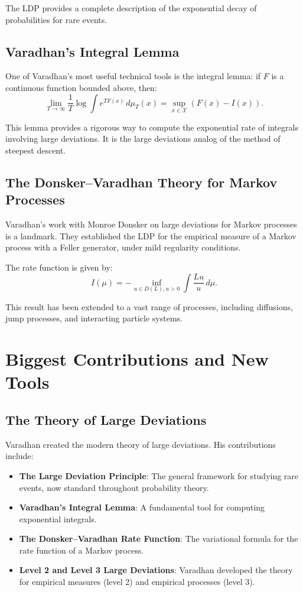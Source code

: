 The LDP provides a complete description of the exponential decay of probabilities for rare events.

\subsection{Varadhan's Integral Lemma}

One of Varadhan's most useful technical tools is the integral lemma: if $F$ is a continuous function bounded above, then:
\[
\lim_{T \to \infty} \frac{1}{T} \log \int e^{T F(x)} \, d\mu_T(x) = \sup_{x \in \mathcal{X}} (F(x) - I(x)).
\]

This lemma provides a rigorous way to compute the exponential rate of integrals involving large deviations. It is the large deviations analog of the method of steepest descent.

\subsection{The Donsker--Varadhan Theory for Markov Processes}

Varadhan's work with Monroe Donsker on large deviations for Markov processes is a landmark. They established the LDP for the empirical measure of a Markov process with a Feller generator, under mild regularity conditions.

The rate function is given by:
\[
I(\mu) = -\inf_{u \in D(L), u > 0} \int \frac{Lu}{u} \, d\mu.
\]

This result has been extended to a vast range of processes, including diffusions, jump processes, and interacting particle systems.

\section{Biggest Contributions and New Tools}

\subsection{The Theory of Large Deviations}

Varadhan created the modern theory of large deviations. His contributions include:

\begin{itemize}
\item \textbf{The Large Deviation Principle}: The general framework for studying rare events, now standard throughout probability theory.

\item \textbf{Varadhan's Integral Lemma}: A fundamental tool for computing exponential integrals.

\item \textbf{The Donsker--Varadhan Rate Function}: The variational formula for the rate function of a Markov process.

\item \textbf{Level 2 and Level 3 Large Deviations}: Varadhan developed the theory for empirical measures (level 2) and empirical processes (level 3).
\end{itemize}

